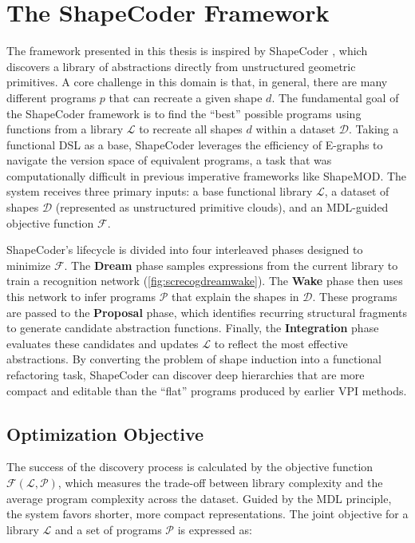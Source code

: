 \documentclass{thesis}
\begin{document}
\section{The ShapeCoder Framework}

The framework presented in this thesis is inspired by ShapeCoder \cite{ShapeCoder}, which discovers a library of abstractions directly from unstructured geometric primitives. A core challenge in this domain is that, in general, there are many different programs $p$ that can recreate a given shape $d$. The fundamental goal of the ShapeCoder framework is to find the ``best'' possible programs using functions from a library $\mathcal{L}$ to recreate all shapes $d$ within a dataset $\mathcal{D}$. Taking a functional DSL as a base, ShapeCoder leverages the efficiency of E-graphs to navigate the version space of equivalent programs, a task that was computationally difficult in previous imperative frameworks like ShapeMOD. The system receives three primary inputs: a base functional library $\mathcal{L}$, a dataset of shapes $\mathcal{D}$ (represented as unstructured primitive clouds), and an MDL-guided objective function $\mathcal{F}$.

ShapeCoder's lifecycle is divided into four interleaved phases designed to minimize $\mathcal{F}$. The \textbf{Dream} phase samples expressions from the current library to train a recognition network (\autoref{fig:screcogdreamwake}). The \textbf{Wake} phase then uses this network to infer programs $\mathcal{P}$ that explain the shapes in $\mathcal{D}$. These programs are passed to the \textbf{Proposal} phase, which identifies recurring structural fragments to generate candidate abstraction functions. Finally, the \textbf{Integration} phase evaluates these candidates and updates $\mathcal{L}$ to reflect the most effective abstractions. By converting the problem of shape induction into a functional refactoring task, ShapeCoder can discover deep hierarchies that are more compact and editable than the ``flat'' programs produced by earlier VPI methods.

\subsection{Optimization Objective}

The success of the discovery process is calculated by the objective function $\mathcal{F}(\mathcal{L}, \mathcal{P})$, which measures the trade-off between library complexity and the average program complexity across the dataset. Guided by the MDL principle, the system favors shorter, more compact representations. The joint objective for a library $\mathcal{L}$ and a set of programs $\mathcal{P}$ is expressed as:
\end{document}
